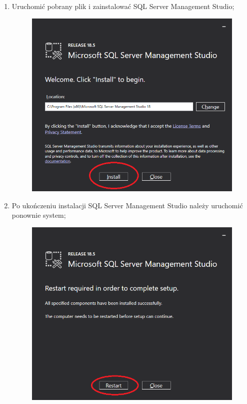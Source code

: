 \documentclass[12pt,a4paper]{article}
\begin{document}
\begin{enumerate}
				\item Uruchomić pobrany plik i zainstalować SQL Server Management Studio;
					\begin{figure}[H]
						\centering
						\includegraphics[scale=0.34]{img/Local_Install_6.png}
					\end{figure}
					
				\item Po ukończeniu instalacji SQL Server Management Studio należy uruchomić ponownie system;
					\begin{figure}[H]
						\centering
						\includegraphics[scale=0.4]{img/Local_Install_7.png}
					\end{figure}
					

\end{enumerate}
\end{document}
